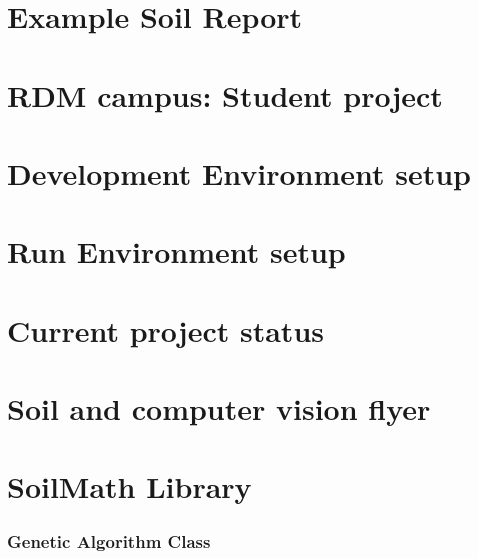 \documentclass[11pt,fleqn,,a4paper,twoside,openright]{book}
\begin{document}
\chapter{Example Soil Report}


\chapter{RDM campus: Student project}\label{RDM_Campus}

\chapter{Development Environment setup}\label{SDE}

\chapter{Run Environment setup}\label{RE}


\chapter{Current project status}

\chapter{Soil and computer vision flyer}


\chapter{SoilMath Library}
\subsection*{Genetic Algorithm Class}


\newpage
\end{document}
